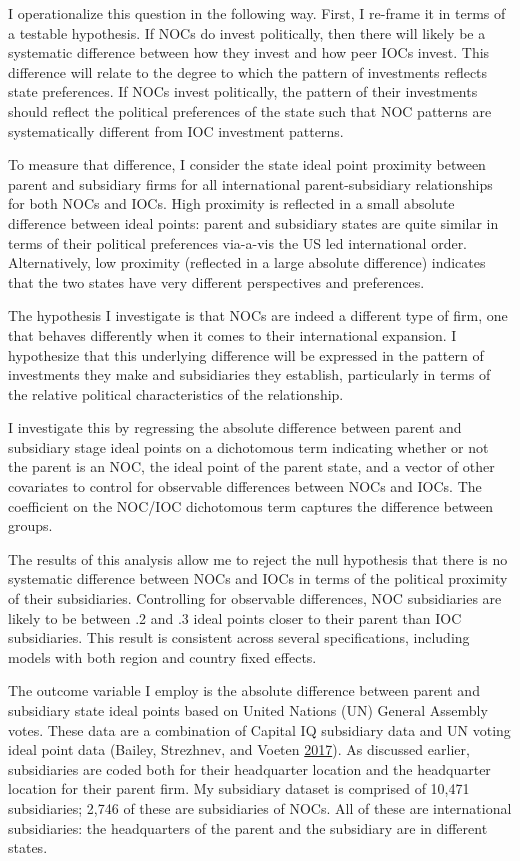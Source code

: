 \documentclass[11pt,]{book}
\begin{document}
I operationalize this question in the following way. First, I re-frame it in terms of a testable hypothesis. If NOCs do invest politically, then there will likely be a systematic difference between how they invest and how peer IOCs invest. This difference will relate to the degree to which the pattern of investments reflects state preferences. If NOCs invest politically, the pattern of their investments should reflect the political preferences of the state such that NOC patterns are systematically different from IOC investment patterns.

To measure that difference, I consider the state ideal point proximity between parent and subsidiary firms for all international parent-subsidiary relationships for both NOCs and IOCs. High proximity is reflected in a small absolute difference between ideal points: parent and subsidiary states are quite similar in terms of their political preferences via-a-vis the US led international order. Alternatively, low proximity (reflected in a large absolute difference) indicates that the two states have very different perspectives and preferences.

The hypothesis I investigate is that NOCs are indeed a different type of firm, one that behaves differently when it comes to their international expansion. I hypothesize that this underlying difference will be expressed in the pattern of investments they make and subsidiaries they establish, particularly in terms of the relative political characteristics of the relationship.

I investigate this by regressing the absolute difference between parent and subsidiary stage ideal points on a dichotomous term indicating whether or not the parent is an NOC, the ideal point of the parent state, and a vector of other covariates to control for observable differences between NOCs and IOCs. The coefficient on the NOC/IOC dichotomous term captures the difference between groups.

The results of this analysis allow me to reject the null hypothesis that there is no systematic difference between NOCs and IOCs in terms of the political proximity of their subsidiaries. Controlling for observable differences, NOC subsidiaries are likely to be between .2 and .3 ideal points closer to their parent than IOC subsidiaries. This result is consistent across several specifications, including models with both region and country fixed effects.

The outcome variable I employ is the absolute difference between parent and subsidiary state ideal points based on United Nations (UN) General Assembly votes. These data are a combination of Capital IQ subsidiary data and UN voting ideal point data (Bailey, Strezhnev, and Voeten \protect\hyperlink{ref-bailey_estimating_2017}{2017}). As discussed earlier, subsidiaries are coded both for their headquarter location and the headquarter location for their parent firm. My subsidiary dataset is comprised of 10,471 subsidiaries; 2,746 of these are subsidiaries of NOCs. All of these are international subsidiaries: the headquarters of the parent and the subsidiary are in different states.
\end{document}
